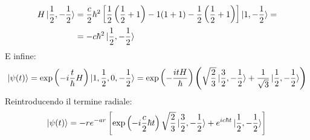 \documentclass[../../FisicaTeorica.tex]{subfiles}
\begin{document}
\begin{enumerate}
\begin{align*}
H\ket{\frac{1}{2},-\frac{1}{2}}&=\frac{c}{2}\hbar^2\left[\frac{1}{2}\left(\frac{1}{2}+1\right)-1(1+1)-\frac{1}{2}\left(\frac{1}{2}+1\right)\right]\ket{1,-\frac{1}{2}}=\\
&=-c\hbar^2 \ket{\frac{1}{2},-\frac{1}{2}}
\end{align*}
E infine:
\begin{align*}
\ket{\psi(t)}=\exp\left(-i\frac{t}{\hbar}H\right) \ket{1,\frac{1}{2},0,-\frac{1}{2}} = \exp\left(-\frac{itH}{\hbar}\right) \left(\sqrt{\frac{2}{3}}\ket{\frac{3}{2},-\frac{1}{2}}+\frac{1}{\sqrt{3}}\ket{\frac{1}{2},-\frac{1}{2}}\right)
\end{align*}
Reintroducendo il termine radiale:
\begin{align*}
\ket{\psi(t)}=-r e^{-ar} \left[\exp\left(-i\frac{c}{2}\hbar t\right) \sqrt{\frac{2}{3}}\ket{\frac{3}{2},-\frac{1}{2}}+e^{ic\hbar t}\ket{\frac{1}{2},-\frac{1}{2}}\right]
\end{align*}
\end{enumerate}
\end{document}
